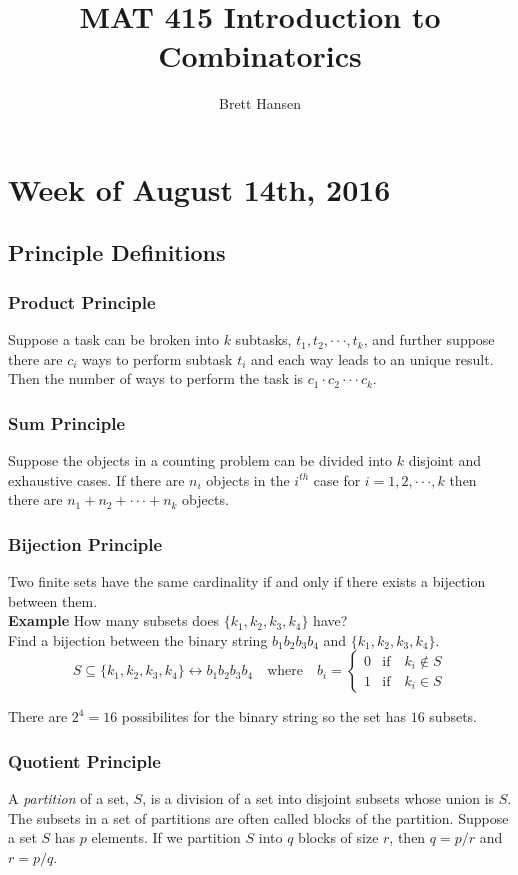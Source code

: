 \documentclass{article}
\title{MAT 415 Introduction to Combinatorics}
\author{Brett Hansen}
\date{}
\newcommand{\ellipse}{\cdot\cdot\cdot}
\begin{document}
\maketitle
\tableofcontents
\break

\section{Week of August 14th, 2016}
\subsection{Principle Definitions}
\subsubsection{Product Principle}
Suppose a task can be broken into $k$ subtasks, $t_1,t_2,\ellipse,t_k$, and further suppose there are $c_i$ ways to perform subtask $t_i$ and each way leads to an unique result. Then the number of ways to perform the task is $c_1 \cdot c_2 \ellipse c_k$.

\subsubsection{Sum Principle}
Suppose the objects in a counting problem can be divided into $k$ disjoint and exhaustive cases. If there are $n_i$ objects in the $i^{th}$ case for $i=1,2,\ellipse,k$ then there are $n_1+n_2+\ellipse+n_k$ objects.

\subsubsection{Bijection Principle}
Two finite sets have the same cardinality if and only if there exists a bijection between them. \\
\newline
\textbf{Example} \quad How many subsets does $\{k_1,k_2,k_3,k_4\}$ have? \\
Find a bijection between the binary string $b_1b_2b_3b_4$ and $\{k_1,k_2,k_3,k_4\}$. \\

$$S\subseteq\{k_1,k_2,k_3,k_4\}\longleftrightarrow b_1b_2b_3b_4 \quad\text{where}\quad b_i=
\begin{cases} 
	0 & \text{if}\quad k_i \notin S\\
	1 & \text{if}\quad k_i \in S
\end{cases}
$$

\noindent There are $2^4=16$ possibilites for the binary string so the set has $16$ subsets.

\subsubsection{Quotient Principle}
A \textit{partition} of a set, $S$, is a division of a set into disjoint subsets whose union is $S$. The subsets in a set of partitions are often called blocks of the partition. \newline
\noindent Suppose a set $S$ has $p$ elements. If we partition $S$ into $q$ blocks of size $r$, then $q=p/r$ and $r=p/q$.
\end{document}
